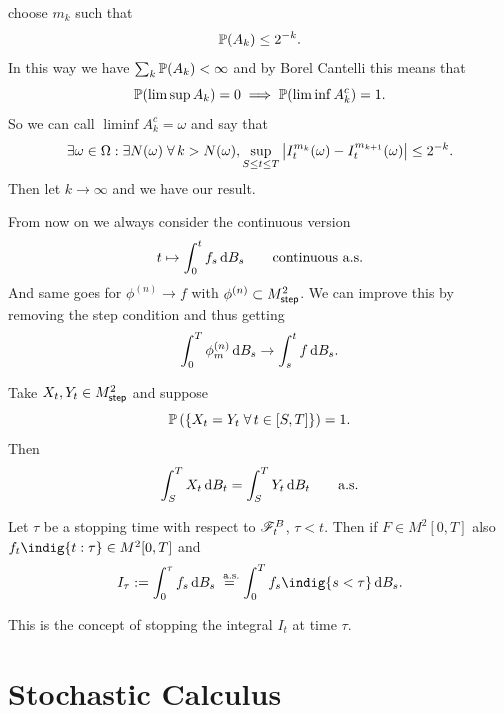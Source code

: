 \documentclass[12pt]{report}
\begin{document}
\begin{fancyproof}
		choose $m_{k}$ such that 
		\begin{equation*}
			\mathbb{P}(A_{k})\leq 2^{-k}.
		\end{equation*}
		In this way we have $\sum_{k}\mathbb{P}(A_{k})<\infty$ and by Borel Cantelli this means that 
		\begin{equation*}
			\mathbb{P}(\limsup A_{k})=0\implies\mathbb{P}(\liminf A^{c}_{k})=1.
		\end{equation*}
		So we can call $\liminf A^{c}_{k}=\omega$ and say that 
		\begin{equation*}
			\exists\omega\in\Omega:\exists N(\omega)\;\forall\, k>N(\omega),\sup_{S\leq t\leq T}\left|I^{m_{k}}_{t}(\omega)-I^{m_{k+1}}_{t}(\omega)\right|\leq 2^{-k}.
		\end{equation*}
Then let $k\to\infty$ and we have our result.		
\end{fancyproof}
\begin{remark}
	From now on we always consider the continuous version
	\begin{equation*}
		t\mapsto\int_{0}^{t}f_{s}\mathop{}\!\mathrm{d} B_{s}\qquad\text{continuous a.s.}
	\end{equation*}
	And same goes for $\phi^{(n)}\to f$ with $\phi^{(n)}\subset M^{2}_{\mathsf{step}}$. We can improve this by removing the step condition and thus getting
	\begin{equation*}
		\int_{0}^{T}\phi^{(n)}_{m}\mathop{}\!\mathrm{d} B_{s}\to\int_{s}^{t}f\mathop{}\!\mathrm{d} B_{s}.
	\end{equation*}
\end{remark}
\begin{theorem}
	Take $X_{t}, Y_{t}\in M^{2}_{\mathsf{step}}$ and suppose 
	\begin{equation*}
		\mathbb{P}\left(\left\{X_{t}=Y_{t}\;\forall\, t\in[S,T]\right\}\right)=1.
	\end{equation*}
	Then
	\begin{equation*}
		\int_{S}^{T}X_{t}\mathop{}\!\mathrm{d} B_{t}=\int_{S}^{T}Y_{t}\mathop{}\!\mathrm{d} B_{t}\qquad\text{a.s.}
	\end{equation*}
\end{theorem}
\begin{theorem}
	Let $\tau$ be a stopping time with respect to $\mathscr{F}^{B}_{t}$, $\tau<t$. Then if $F\in M^{2}[0,T]$ also $f_{t}\indig{t:\tau}\in M^{2}[0,T]$ and
	\begin{equation*}
		I_{\tau}:=\int_{0}^{\tau}f_{s}\dbs\stackrel{\as{}}{=}\int_{0}^{T}f_{s}\indig{s<\tau}\dbs.
	\end{equation*}
\end{theorem}
This is the concept of stopping the integral $I_{t}$ at time $\tau$.
\chapter{Stochastic Calculus}
\end{document}
